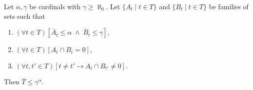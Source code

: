 Let $\alpha, \gamma$ be cardinals with $\gamma \geq \aleph_0$. Let $\{A_t \mid t \in T\}$ and $\{B_t \mid t \in T\}$ be families of sets such that
\begin{enumerate}
\item $(\forall t \in T)[\bar{A}_t \leq \alpha \;\wedge\; \bar{B}_t \leq \gamma]$,
\item $(\forall t \in T)[A_t \cap B_t = 0]$,
\item $(\forall t, t' \in T)[t \neq t' \rightarrow A_t \cap B_{t'} \neq 0]$.
\end{enumerate}
Then $\bar{T} \leq \gamma^\alpha$.

